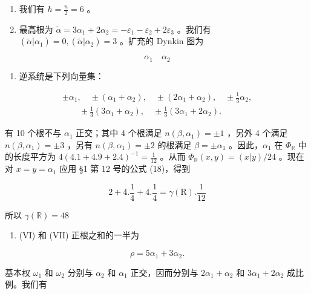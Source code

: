 \begin{enumerate}
\def\labelenumi{(\Roman{enumi})}
\setcounter{enumi}{2}
\item
  我们有 \(h = \frac{n}{2} = 6\) 。
\item
  最高根为 \(\tilde{\alpha} = 3\alpha_{1} + 2\alpha_{2} = -\varepsilon_{1} - \varepsilon_{2} + 2\varepsilon_{3}\) 。我们有 \((\tilde{\alpha}|\alpha_{1}) = 0, (\tilde{\alpha}|\alpha_{2}) = 3\) 。扩充的 Dynkin 图为
\end{enumerate}

\[
\alpha_ {1} \quad \alpha_ {2}
\]

\begin{enumerate}
\def\labelenumi{(\Alph{enumi})}
\setcounter{enumi}{21}
\tightlist
\item
  逆系统是下列向量集：
\end{enumerate}

\[
\begin{array}{l} \pm \alpha_ {1}, \quad \pm (\alpha_ {1} + \alpha_ {2}), \quad \pm (2 \alpha_ {1} + \alpha_ {2}), \quad \pm \frac {1}{3} \alpha_ {2}, \\ \qquad \pm \frac {1}{3} (3 \alpha_ {1} + \alpha_ {2}), \quad \pm \frac {1}{3} (3 \alpha_ {1} + 2 \alpha_ {2}). \end{array}
\]

  有 10 个根不与 \(\alpha_{1}\) 正交；其中 4 个根满足 \(n(\beta, \alpha_{1}) = \pm 1\) ，另外 4 个满足 \(n(\beta, \alpha_{1}) = \pm 3\) ，另有 \(n(\beta, \alpha_{1}) = \pm 2\) 的根满足 \(\beta = \pm \alpha_{1}\) 。因此，\(\alpha_{1}\) 在 \(\Phi_{\mathbb{R}}\) 中的长度平方为 \(4(4.1 + 4.9 + 2.4)^{-1} = \frac{1}{12}\) 。从而 \(\Phi_{\mathbb{R}}(x, y) = (x|y)/24\) 。现在对 \(x = y = \alpha_{1}\) 应用 §1 第 12 号的公式 (18)，得到

\[
2 + 4. \frac {1}{4} + 4. \frac {1}{4} = \gamma (\mathrm{R}). \frac {1}{12}
\]

所以 \(\gamma (\mathbb{R}) = 48\)

\begin{enumerate}
\def\labelenumi{(\Roman{enumi})}
\setcounter{enumi}{5}
\tightlist
\item
  (VI) 和 (VII) 正根之和的一半为
\end{enumerate}

\[
\rho = 5 \alpha_ {1} + 3 \alpha_ {2}.
\]

基本权 \(\omega_{1}\) 和 \(\omega_{2}\) 分别与 \(\alpha_{2}\) 和 \(\alpha_{1}\) 正交，因而分别与 \(2\alpha_{1} + \alpha_{2}\) 和 \(3\alpha_{1} + 2\alpha_{2}\) 成比例。我们有


